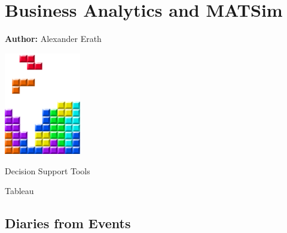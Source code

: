 \chapter{Business Analytics and MATSim }
\label{ch:businessanalytics}

\hfill \textbf{Author:} Alexander Erath

\begin{center} \includegraphics[width=0.25\textwidth, angle=0]{figures/MATSimBook.png} \end{center}


Decision Support Tools

Tableau
\citet[][]{ErathEtAl_unpub_EASTS_2013, ErathEtAl_unpub_STRC_2013}

\section{Diaries from Events }





